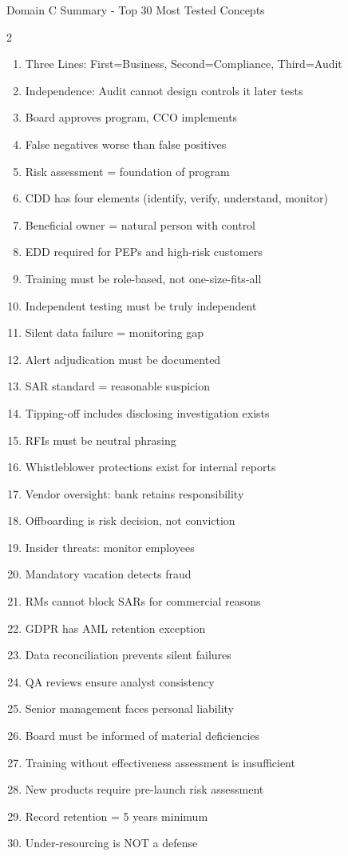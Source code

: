\documentclass[11pt,a4paper]{beamer}
\begin{document}
	\begin{frame}{Domain C Summary - Top 30 Most Tested Concepts}
		\begin{multicols}{2}
			\begin{enumerate}
				\item Three Lines: First=Business, Second=Compliance, Third=Audit
				\item Independence: Audit cannot design controls it later tests
				\item Board approves program, CCO implements
				\item False negatives worse than false positives
				\item Risk assessment = foundation of program
				\item CDD has four elements (identify, verify, understand, monitor)
				\item Beneficial owner = natural person with control
				\item EDD required for PEPs and high-risk customers
				\item Training must be role-based, not one-size-fits-all
				\item Independent testing must be truly independent
				\item Silent data failure = monitoring gap
				\item Alert adjudication must be documented
				\item SAR standard = reasonable suspicion
				\item Tipping-off includes disclosing investigation exists
				\item RFIs must be neutral phrasing
				\item Whistleblower protections exist for internal reports
				\item Vendor oversight: bank retains responsibility
				\item Offboarding is risk decision, not conviction
				\item Insider threats: monitor employees
				\item Mandatory vacation detects fraud
				\item RMs cannot block SARs for commercial reasons
				\item GDPR has AML retention exception
				\item Data reconciliation prevents silent failures
				\item QA reviews ensure analyst consistency
				\item Senior management faces personal liability
				\item Board must be informed of material deficiencies
				\item Training without effectiveness assessment is insufficient
				\item New products require pre-launch risk assessment
				\item Record retention = 5 years minimum
				\item Under-resourcing is NOT a defense
			\end{enumerate}
		\end{multicols}
	\end{frame}
	
\end{document}
